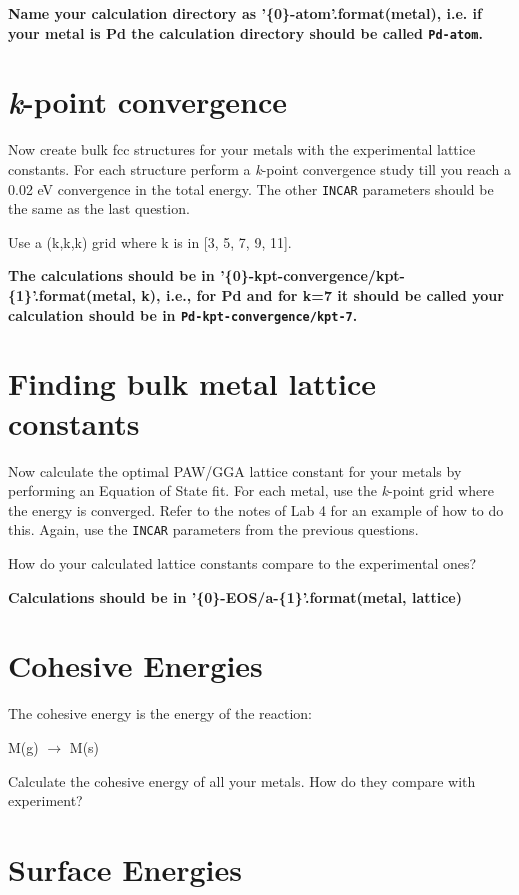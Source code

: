 \documentclass[11pt]{article}
\begin{document}
\textbf{Name your calculation directory as '\{0\}-atom'.format(metal), i.e. if your metal is Pd the calculation directory should be called \texttt{Pd-atom}.}

\section{\emph{k}-point convergence}
\label{sec-2}

Now create bulk fcc structures for your metals with the experimental lattice constants. For each structure perform a \emph{k}-point convergence study till you reach a 0.02 eV convergence in the total energy. The other \texttt{INCAR} parameters should be the same as the last question.

Use a (k,k,k) grid where k is in [3, 5, 7, 9, 11].

\textbf{The calculations should be in '\{0\}-kpt-convergence/kpt-\{1\}'.format(metal, k), i.e., for Pd and for k=7 it should be called your calculation should be in \texttt{Pd-kpt-convergence/kpt-7}.} 

\section{Finding bulk metal lattice constants}
\label{sec-3}

Now calculate the optimal PAW/GGA lattice constant for your metals by performing an Equation of State fit. For each metal, use the \emph{k}-point grid where the energy is converged. Refer to the notes of Lab 4 for an example of how to do this. Again, use the \texttt{INCAR} parameters from the previous questions. 

How do your calculated lattice constants compare to the experimental ones?

\textbf{Calculations should be in '\{0\}-EOS/a-\{1\}'.format(metal, lattice)}

\section{Cohesive Energies}
\label{sec-4}

The cohesive energy is the energy of the reaction:

M(g) $\rightarrow$ M(s)

Calculate the cohesive energy of all your metals. How do they compare with experiment?

\section{Surface Energies}
\label{sec-5}
\end{document}
